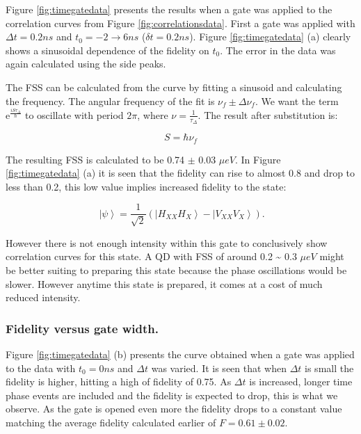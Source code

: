 \documentclass[12pt, twoside]{article}
\numberwithin{equation}{section}
\begin{document}
Figure \ref{fig:timegatedata} presents the results when a gate was
applied to the correlation curves from Figure
\ref{fig:correlationsdata}. First a gate was applied with
$\Delta t = 0.2 ns$ and $t_0 = -2 \to 6 ns$ ($\delta t = 0.2ns$). Figure
\ref{fig:timegatedata} (a) clearly shows a sinusoidal dependence of the
fidelity on $t_0$. The error in the data was again calculated using the
side peaks.

The FSS can be calculated from the curve by fitting a sinusoid and
calculating the frequency. The angular frequency of the fit is
$\nu_f \pm \Delta \nu_f$. We want the term
$\mathrm e^{\frac{i S \tau_\Delta}{\hbar}}$ to oscillate with period
$2\pi$, where $\nu = \frac{1}{\tau_\Delta}$. The result after
substitution is:

\begin{equation}
S = \hbar \nu_f
\end{equation}

The resulting FSS is calculated to be 0.74 $\pm$ 0.03 $\mu eV$. In
Figure \ref{fig:timegatedata} (a) it is seen that the fidelity can rise
to almost 0.8 and drop to less than 0.2, this low value implies
increased fidelity to the state:

\begin{equation}
\ \left|\psi\right\rangle = \frac{1}{\sqrt{2}} 
\left(\left|H_{XX} H_X\right\rangle - \left|V_{XX} V_X\right\rangle \right).
\end{equation}

However there is not enough intensity within this gate to conclusively
show correlation curves for this state. A QD with FSS of around 0.2
\textasciitilde{} 0.3 $\mu eV$ might be better suiting to preparing this
state because the phase oscillations would be slower. However anytime
this state is prepared, it comes at a cost of much reduced intensity.

\subsubsection{Fidelity versus gate
width.}\label{fidelity-versus-gate-width.}

Figure \ref{fig:timegatedata} (b) presents the curve obtained when a
gate was applied to the data with $t_0 = 0ns$ and $\Delta t$ was varied.
It is seen that when $\Delta t$ is small the fidelity is higher, hitting
a high of fidelity of 0.75. As $\Delta t$ is increased, longer time
phase events are included and the fidelity is expected to drop, this is
what we observe. As the gate is opened even more the fidelity drops to a
constant value matching the average fidelity calculated earlier of
$F = 0.61 \pm 0.02$.
\end{document}
